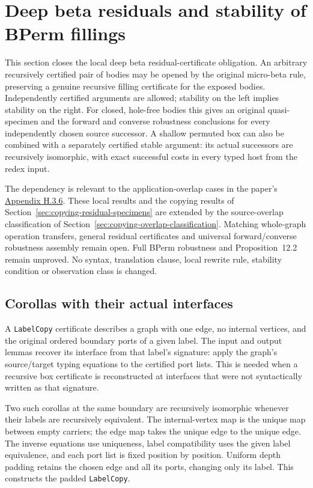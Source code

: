 \clearpage
\section{Deep beta residuals and stability of BPerm fillings}
\label{sec:copying-beta-residuals}
This section closes the local deep beta residual-certificate obligation.
An arbitrary recursively certified pair of bodies may be opened by the
original micro-beta rule, preserving a genuine recursive filling certificate
for the exposed bodies. Independently certified arguments are allowed;
stability on the left implies stability on the right. For closed, hole-free
bodies this gives an original quasi-specimen and the forward and converse
robustness conclusions for every independently chosen source successor.
A shallow permuted box can also be combined with a separately certified
stable argument: its actual successors are recursively isomorphic, with
exact successful costs in every typed host from the redex input.

The dependency is relevant to the application-overlap cases in the paper's
\href{https://arxiv.org/html/1907.01257v5\#A8.SS3.SSS6}{Appendix H.3.6}.
These local results and the copying results of
Section~\ref{sec:copying-residual-specimens} are extended by the source-overlap
classification of Section~\ref{sec:copying-overlap-classification}. Matching
whole-graph operation transfers, general residual certificates and universal
forward/converse robustness assembly remain open. Full BPerm
robustness and Proposition~12.2 remain unproved. No syntax, translation clause,
local rewrite rule, stability condition or observation class is changed.

\subsection{Corollas with their actual interfaces}
A \texttt{LabelCopy} certificate describes a graph with one edge, no internal
vertices, and the original ordered boundary ports of a given label.
The input and output lemmas recover its interface from that label's signature:
apply the graph's source/target typing equations to the certified port lists.
This is needed when a recursive box certificate is reconstructed at interfaces
that were not syntactically written as that signature.


Two such corollas at the same boundary are recursively isomorphic whenever
their labels are recursively equivalent. The internal-vertex map is the unique
map between empty carriers; the edge map takes the unique edge to the unique
edge. The inverse equations use uniqueness, label compatibility uses the
given label equivalence, and each port list is fixed position by position.
Uniform depth padding retains the chosen edge and all its ports, changing
only its label. This constructs the padded \texttt{LabelCopy}.

